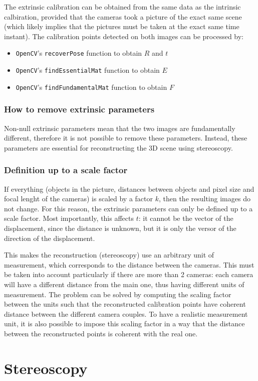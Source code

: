 The extrinsic calibration can be obtained from the same data as the intrinsic calbiration, provided that the cameras took a picture of the exact same scene (which likely implies that the pictures must be taken at the exact same time instant).
The calibration points detected on both images can be processed by:
\begin{itemize}
	\itemsep 0em
	\item \texttt{OpenCV}'s \texttt{recoverPose} function to obtain $R$ and $t$
	\item \texttt{OpenCV}'s \texttt{findEssentialMat} function to obtain $E$
	\item \texttt{OpenCV}'s \texttt{findFundamentalMat} function to obtain $F$
\end{itemize}

\subsubsection{How to remove extrinsic parameters}

Non-null extrinsic parameters mean that the two images are fundamentally different, therefore it is not possible to remove these parameters.
Instead, these parameters are essential for reconstructing the 3D scene using stereoscopy.

\subsubsection{Definition up to a scale factor}

If everything (objects in the picture, distances between objects and pixel size and focal lenght of the cameras) is scaled by a factor $k$, then the resulting images do not change.
For this reason, the extrinsic parameters can only be defined up to a scale factor.
Most importantly, this affects $t$: it cannot be the vector of the displacement, since the distance is unknown, but it is only the versor of the direction of the displacement.

This makes the reconstruction (stereoscopy) use an arbitrary unit of measurement, which corresponds to the distance between the cameras.
This must be taken into account particularly if there are more than 2 cameras: each camera will have a different distance from the main one, thus having different units of measurement.
The problem can be solved by computing the scaling factor between the units such that the reconstructed calibration points have coherent distance between the different camera couples.
To have a realistic measurement unit, it is also possible to impose this scaling factor in a way that the distance between the reconstructed points is coherent with the real one.

\section{Stereoscopy}

